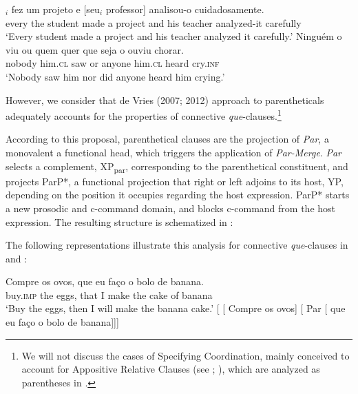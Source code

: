 \documentclass[output=paper,colorlinks,citecolor=brown,
]{langscibook}
\begin{document}
\ea \label{ex:matos:anafora}
 \ea \label{ex:matos:anafora-a}
 $_i$ fez um projeto e [seu$_i$ professor] analisou-o cuidadosamente.\\
	  every the student made a project and his teacher analyzed-it carefully\\
 \glt ‘Every student made a project and his teacher analyzed it carefully.’
 \ex \label{ex:matos:anafora-b}
 \gll Ninguém o viu ou {quem quer que seja} o ouviu chorar.\\
      nobody him.\textsc{cl} saw or anyone him.\textsc{cl} heard cry.\textsc{inf}\\ 
 \glt ‘Nobody saw him nor did anyone heard him crying.’
  \label{ex:matos:anafora-c}
 \z
\z 

However, we consider that \citet{de_vries_invisible_2007,de_vries_unconventional_2012} de Vries (2007; 2012) approach to parentheticals adequately accounts for the properties of connective \textit{que}-clauses.\footnote{We will not discuss the cases of Specifying Coordination, mainly conceived to account for Appositive Relative Clauses (see \citealt{de_vries_invisible_2007}; \citeyear{de_vries_relative_2018}), which are analyzed as parentheses in \citet{griffiths_parenthesis_2019}.}

According to this proposal, parenthetical clauses are the projection of \textit{Par}, a monovalent a functional head, which triggers the application of \textit{Par-Merge}. \textit{Par} selects a complement, XP\textsubscript{par}, corresponding to the parenthetical constituent, and projects ParP*, a functional projection that right or left adjoins to its host, YP, depending on the position it occupies regarding the host expression.  ParP* starts a new prosodic and c-command domain, and blocks c-command from the host expression. The resulting structure is schematized in :

\ea \label{ex:matos:yp}
 \z
\z 

The following representations illustrate this analysis for connective \textit{que}-clauses in  and :

\ea \label{ex:matos:parenteticos-ovos}
 \ea \label{ex:matos:parenteticos-ovos-a} 
 \gll Compre os ovos, que eu faço o bolo de banana.\\
	  buy.\textsc{imp} the eggs, that I make the cake of banana\\
 \glt ‘Buy the eggs, then I will make the banana cake.’ 
 \ex \label{ex:matos:parenteticos-ovos-b}
 [ [ Compre os ovos] [ Par [ que eu faço o bolo de banana]]]
 \z
\z 
\end{document}
